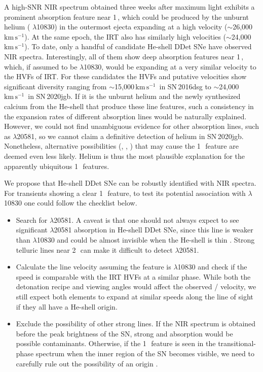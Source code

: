 \documentclass[twocolumn]{aastex631}
\newcommand{\sn}{SN\,2020jgb}
\newcommand{\kms}{$\mathrm{km}\,\mathrm{s}^{-1}$}
\begin{document}
A high-SNR NIR spectrum obtained three weeks after maximum light exhibits a prominent absorption feature near 1\,\micron, which could be produced by the unburnt helium ( $\lambda$10830) in the outermost ejecta expanding at a high velocity ($\sim$26,000\,\kms). At the same epoch, the  IRT also has similarly high velocities ($\sim$24,000\,\kms). To date, only a handful of candidate He-shell DDet SNe have observed NIR spectra. Interestingly, all of them show deep absorption features near 1\,\micron, which, if assumed to be  $\lambda$10830, would be expanding at a very similar velocity to the HVFs of  IRT. For these candidates the  HVFs and putative  velocities show significant diversity ranging from $\sim$15,000\,\kms\ in SN\,2016dsg to $\sim$24,000\,\kms\ in \sn. If it is the unburnt helium and the newly synthesized calcium from the He-shell that produce these line features, such a consistency in the expansion rates of different absorption lines would be naturally explained. However, we could not find unambiguous evidence for other  absorption lines, such as  $\lambda$20581, so we cannot claim a definitive detection of helium in \sn. Nonetheless, alternative possibilities (, , ) that may cause the 1\,\micron\ feature are deemed even less likely. Helium is thus the most plausible explanation for the apparently ubiquitous 1\,\micron\ features.

We propose that He-shell DDet SNe can be robustly identified with NIR spectra. For transients showing a clear 1\,\micron\ feature, to test its potential association with  $\lambda$10830 one could follow the checklist below.
\begin{itemize}
    \item Search for  $\lambda$20581. A caveat is that one should not always expect to see significant  $\lambda$20581 absorption in He-shell DDet SNe, since this line is weaker than  $\lambda$10830 and could be almost invisible when the He-shell is thin \citep{Boyle2017_Helium}. Strong telluric lines near 2\,\micron\ can make it difficult to detect  $\lambda$20581.
    \item Calculate the line velocity assuming the feature is  $\lambda$10830 and check if the speed is comparable with the  IRT HVFs at a similar phase. While both the detonation recipe and viewing angles would affect the observed / velocity, we still expect both elements to expand at similar speeds along the line of sight if they all have a He-shell origin.
    \item Exclude the possibility of other strong lines. If the NIR spectrum is obtained before the peak brightness of the SN, strong  and  absorption \citep{Hsiao_CSP_2019} would be possible contaminants. Otherwise, if the 1\,\micron\ feature is seen in the transitional-phase spectrum when the inner region of the SN becomes visible, we need to carefully rule out the possibility of an  origin \citep{Marion2009_NIR}.
\end{itemize}
\end{document}
